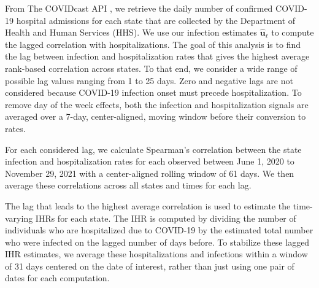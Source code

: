 From The COVIDcast API \citep{reinhart2021open}, we retrieve the daily number of
confirmed COVID-19 hospital admissions for each state that are collected by the
\US Department of Health and Human Services (HHS). We use our infection
estimates $\mathbf{\widehat{u}}_\ell$ to compute the lagged correlation with 
hospitalizations. The goal of this analysis is to find the lag between
infection and hospitalization rates that gives the highest average rank-based
correlation across \US states. To that end, we consider a wide range of possible
lag values ranging from 1 to 25 days. Zero and negative lags are not considered
because COVID-19 infection onset must precede hospitalization.
To remove day of the week effects, both the infection and hospitalization
signals are averaged over a 7-day, center-aligned, moving window before their
conversion to rates.

For each considered lag, we calculate Spearman's correlation between the state
infection and hospitalization rates for each observed between June 1, 2020 to
November 29, 2021 with a center-aligned rolling window of 61 days. We then
average these correlations across all states and times for each lag. 

The lag that leads to the highest average correlation is used to estimate the
time-varying IHRs for each state. The IHR is computed by dividing the number of
individuals who are hospitalized due to COVID-19 by the estimated total number
who were infected on the lagged number of days before. To stabilize these lagged
IHR estimates, we average these hospitalizations and infections within a window
of 31 days centered on the date of interest, rather than just using one pair of
dates for each computation.